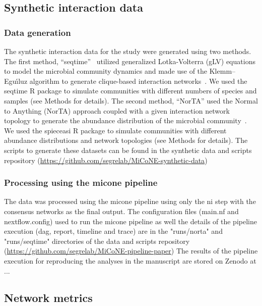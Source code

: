   \subsection*{Synthetic interaction data}

    \subsubsection*{Data generation}
    The synthetic interaction data for the study were generated using two methods.
    The first method, ``seqtime''~\cite{faustSignaturesEcologicalProcesses2018} utilized generalized Lotka-Volterra (gLV) equations to model the microbial community dynamics and made use of the Klemm–Eguı́luz algorithm to generate clique-based interaction networks~\cite{Rottjers2018}.
    We used the seqtime R package to simulate communities with different numbers of species and samples (see Methods for details).
    The second method, ``NorTA'' used the Normal to Anything (NorTA) approach coupled with a given interaction network topology to generate the abundance distribution of the microbial community~\cite{Kurtz2015}.
    We used the spieceasi R package to simulate communities with different abundance distributions and network topologies (see Methods for details).
    The scripts to generate these datasets can be found in the synthetic data and scripts repository (\href{https://github.com/segrelab/MiCoNE-synthetic-data}{https://github.com/segrelab/MiCoNE-synthetic-data})

    \subsubsection*{Processing using the \ac{micone} pipeline}
    The data was processed using the \ac{micone} pipeline using only the \ac{ni} step with the consensus networks as the final output.
    The configuration files (main.nf and nextflow.config) used to run the \ac{micone} pipeline as well the details of the pipeline execution (dag, report, timeline and trace) are in the "runs/norta" and "runs/seqtime" directories of the data and scripts repository (\href{https://github.com/segrelab/MiCoNE-pipeline-paper}{https://github.com/segrelab/MiCoNE-pipeline-paper})
    The results of the pipeline execution for reproducing the analyses in the manuscript are stored on Zenodo at ...


  \subsection*{Network metrics}

